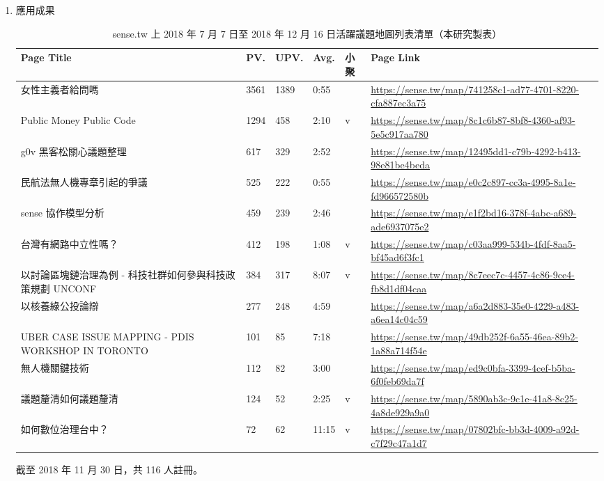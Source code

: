 \documentclass[12pt,a4paper]{article}
\begin{document}
\begin{enumerate}
\item 應用成果
\label{sec:org9365708}
\begin{table}[htbp]
\caption{\label{tab:org1c5b747}
sense.tw 上 2018 年 7 月 7 日至 2018 年 12 月 16 日活躍議題地圖列表清單（本研究製表）}
\centering
\setlength{\tabcolsep}{3pt} 
\begin{tabular}{p{130pt}llllp{204pt}}
\toprule
Page Title & PV. & UPV. & Avg. & 小聚 & Page Link\\
\midrule
女性主義者給問嗎 & 3561 & 1389 & 0:55 &  & \url{https://sense.tw/map/741258c1-ad77-4701-8220-cfa887ec3a75}\\
Public Money Public Code & 1294 & 458 & 2:10 & v & \url{https://sense.tw/map/8c1c6b87-8bf8-4360-af93-5e5c917aa780}\\
g0v 黑客松關心議題整理 & 617 & 329 & 2:52 &  & \url{https://sense.tw/map/12495dd1-c79b-4292-b413-98e81be4beda}\\
民航法無人機專章引起的爭議 & 525 & 222 & 0:55 &  & \url{https://sense.tw/map/e0c2c897-cc3a-4995-8a1e-fd966572580b}\\
sense 協作模型分析 & 459 & 239 & 2:46 &  & \url{https://sense.tw/map/e1f2bd16-378f-4abc-a689-ade6937075e2}\\
台灣有網路中立性嗎？ & 412 & 198 & 1:08 & v & \url{https://sense.tw/map/c03aa999-534b-4fdf-8aa5-bf45ad6f3fc1}\\
以討論區塊鏈治理為例 - 科技社群如何參與科技政策規劃 UNCONF & 384 & 317 & 8:07 & v & \url{https://sense.tw/map/8c7eec7c-4457-4c86-9ce4-fb8d1df04caa}\\
以核養綠公投論辯 & 277 & 248 & 4:59 &  & \url{https://sense.tw/map/a6a2d883-35e0-4229-a483-a6ea14c04c59}\\
UBER CASE ISSUE MAPPING - PDIS WORKSHOP IN TORONTO & 101 & 85 & 7:18 &  & \url{https://sense.tw/map/49db252f-6a55-46ea-89b2-1a88a714f54e}\\
無人機關鍵技術 & 112 & 82 & 3:00 &  & \url{https://sense.tw/map/ed9c0bfa-3399-4cef-b5ba-6f0feb69da7f}\\
議題釐清如何議題釐清 & 124 & 52 & 2:25 & v & \url{https://sense.tw/map/5890ab3c-9c1e-41a8-8c25-4a8de929a9a0}\\
如何數位治理台中？ & 72 & 62 & 11:15 & v & \url{https://sense.tw/map/07802bfc-bb3d-4009-a92d-c7f29c47a1d7}\\
\bottomrule
\end{tabular}
\end{table}

截至 2018 年 11 月 30 日，共 116 人註冊。


\end{enumerate}
\end{document}

